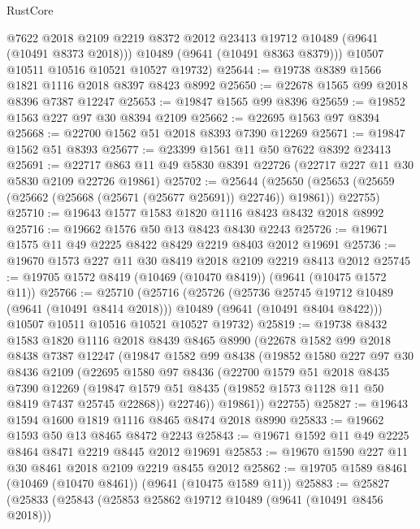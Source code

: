 \begin{lexlean}{RustCore}
\begin{coremodule}
          @7622
          @2018
          @2109
          @2219
          @8372
          @2012
          @23413
          @19712
          @10489
          (@9641 (@10491 @8373 @2018)))
        @10489
        (@9641 (@10491 @8363 @8379)))
      @10507
      @10511
      @10516
      @10521
      @10527
      @19732)
@25644 := @19738 @8389 @1566 @1821 @1116 @2018 @8397 @8423 @8992
@25650 := @22678 @1565 @99 @2018 @8396 @7387 @12247
@25653 := @19847 @1565 @99 @8396
@25659 := @19852 @1563 @227 @97 @30 @8394 @2109
@25662 := @22695 @1563 @97 @8394
@25668 := @22700 @1562 @51 @2018 @8393 @7390 @12269
@25671 := @19847 @1562 @51 @8393
@25677 := @23399 @1561 @11 @50 @7622 @8392 @23413
@25691 := @22717 @863 @11 @49 @5830 @8391 @22726 (@22717 @227 @11 @30 @5830 @2109 @22726 @19861)
@25702 := @25644
    (@25650 (@25653 (@25659 (@25662 (@25668 (@25671 (@25677 @25691)) @22746)) @19861)) @22755)
@25710 := @19643 @1577 @1583 @1820 @1116 @8423 @8432 @2018 @8992
@25716 := @19662 @1576 @50 @13 @8423 @8430 @2243
@25726 := @19671 @1575 @11 @49 @2225 @8422 @8429 @2219 @8403 @2012 @19691
@25736 := @19670 @1573 @227 @11 @30 @8419 @2018 @2109 @2219 @8413 @2012
@25745 := @19705 @1572 @8419 (@10469 (@10470 @8419)) (@9641 (@10475 @1572 @11))
@25766 := @25710
    (@25716
      (@25726
        (@25736 @25745 @19712 @10489 (@9641 (@10491 @8414 @2018)))
        @10489
        (@9641 (@10491 @8404 @8422)))
      @10507
      @10511
      @10516
      @10521
      @10527
      @19732)
@25819 := @19738
    @8432
    @1583
    @1820
    @1116
    @2018
    @8439
    @8465
    @8990
    (@22678
      @1582
      @99
      @2018
      @8438
      @7387
      @12247
      (@19847
        @1582
        @99
        @8438
        (@19852
          @1580
          @227
          @97
          @30
          @8436
          @2109
          (@22695
            @1580
            @97
            @8436
            (@22700
              @1579
              @51
              @2018
              @8435
              @7390
              @12269
              (@19847 @1579 @51 @8435 (@19852 @1573 @1128 @11 @50 @8419 @7437 @25745 @22868))
              @22746))
          @19861))
      @22755)
@25827 := @19643 @1594 @1600 @1819 @1116 @8465 @8474 @2018 @8990
@25833 := @19662 @1593 @50 @13 @8465 @8472 @2243
@25843 := @19671 @1592 @11 @49 @2225 @8464 @8471 @2219 @8445 @2012 @19691
@25853 := @19670 @1590 @227 @11 @30 @8461 @2018 @2109 @2219 @8455 @2012
@25862 := @19705 @1589 @8461 (@10469 (@10470 @8461)) (@9641 (@10475 @1589 @11))
@25883 := @25827
    (@25833
      (@25843
        (@25853 @25862 @19712 @10489 (@9641 (@10491 @8456 @2018)))

\end{coremodule}
\end{lexlean}
